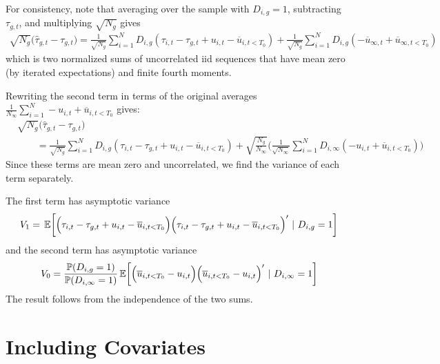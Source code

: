 \documentclass[12pt]{article}
\begin{document}
For consistency, note that averaging over the sample with $D_{i,g} = 1$, subtracting $\tau_{g,t}$, and multiplying $\sqrt{N_{g}}$ gives
\begin{align}
    \sqrt{N_{g}} \big( \widehat{\tau}_{g,t} - \tau_{g,t} \big) 
    = \frac{1}{\sqrt{N_{g}}}\sum_{i=1}^N D_{i,g} (\tau_{i,t} - \tau_{g,t} + u_{i,t} - \overline{u}_{i,t < T_0})
    + \frac{1}{\sqrt{N_{g}}}\sum_{i = 1}^N D_{i,g} (- \overline{u}_{\infty,t} + \overline{u}_{\infty,t < T_0}) 
\end{align}
which is two normalized sums of uncorrelated iid sequences that have mean zero (by iterated expectations) and finite fourth moments. %

Rewriting the second term in terms of the original averages $\frac{1}{N_\infty} \sum_{i=1}^N - u_{i,t} + \overline{u}_{i,t < T_0}$ gives:
\begin{align*}
    &\sqrt{N_{g}} \big( \widehat{\tau}_{g,t} - \tau_{g,t} \big) \\
    &\qquad= \frac{1}{\sqrt{N_{g}}}\sum_{i=1}^N D_{i,g} (\tau_{i,t} - \tau_{g,t} + u_{i,t} - \overline{u}_{i,t < T_0})
    + \sqrt{\frac{N_g}{N_\infty}} \bigg ( \frac{1}{\sqrt{N_\infty}} \sum_{i = 1}^N D_{i,\infty} (- u_{i,t} + \overline{u}_{i,t < T_0} ) \bigg)
\end{align*}
Since these terms are mean zero and uncorrelated, we find the variance of each term separately. 

The first term has asymptotic variance 
\begin{equation}
V_1 = \expec{\Big( \tau_{i,t} - \tau_{g,t} + u_{i,t} - \overline{u}_{i,t < T_0} \Big) \Big( \tau_{i,t} - \tau_{g,t} + u_{i,t} - \overline{u}_{i,t < T_0} \Big)'}{D_{i,g} = 1}
\end{equation}
and the second term has asymptotic variance
\begin{equation}
V_0 = \frac{\mathbb{P}(D_{i,g} = 1)}{\mathbb{P}(D_{i,\infty} = 1)} \expec{ \Big( \overline{u}_{i,t < T_0} - u_{i,t} \Big) \Big( \overline{u}_{i,t < T_0} - u_{i,t} \Big)' }{D_{i,\infty} = 1}
\end{equation}
The result follows from the independence of the two sums.




\section{Including Covariates}
\end{document}
